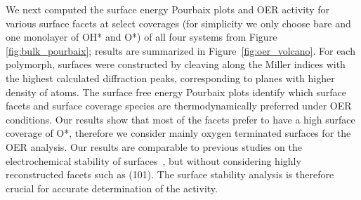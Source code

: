 %
%
We next computed the surface energy Pourbaix plots and OER activity for various surface facets at select coverages (for simplicity we only choose bare and one monolayer of OH* and O*) of all four systems from Figure \ref{fig:bulk_pourbaix};
results are summarized in Figure~\ref{fig:oer_volcano}.
%
For each polymorph, surfaces were constructed by cleaving along the Miller indices with the highest calculated diffraction peaks, corresponding to planes with higher density of atoms.
%
The surface free energy Pourbaix plots identify which surface facets and surface coverage species are thermodynamically preferred under OER conditions.
%
Our results show that most of the facets prefer to have a high surface coverage of O*, therefore we consider mainly oxygen terminated surfaces for the OER analysis.
%
Our results are comparable to previous studies on the electrochemical stability of \IrOtwo surfaces~\cite{Nattino2019,Raman2020},
but without considering highly reconstructed facets such as (101).
%
The surface stability analysis is therefore crucial for accurate determination of the activity.


